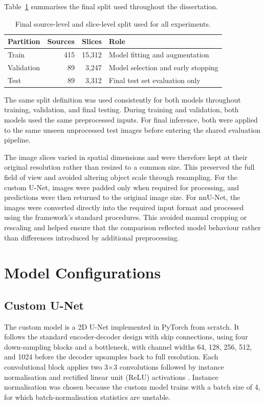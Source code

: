 \documentclass[logo,bsc,singlespacing,parskip,online]{infthesis}
\begin{document}
Table~\ref{tab:split-summary} summarises the final split used throughout the
dissertation. 

\begin{table}[H]
\centering
\small
\caption{Final source-level and slice-level split used for all experiments.}
\label{tab:split-summary}
\begin{tabular}{lrrl}
\toprule
\textbf{Partition} & \textbf{Sources} & \textbf{Slices} & \textbf{Role} \\
\midrule
Train      & 415 & 15{,}312 & Model fitting and augmentation \\
Validation & 89  & 3{,}247  & Model selection and early stopping \\
Test       & 89  & 3{,}312  & Final test set evaluation only \\
\bottomrule
\end{tabular}
\end{table}

The same split definition was used consistently for both models throughout
training, validation, and final testing. During training and validation, both
models used the same preprocessed inputs. For final inference, both were
applied to the same unseen unprocessed test images before entering the shared
evaluation pipeline.

The image slices varied in spatial dimensions and were therefore kept at their
original resolution rather than resized to a common size. This preserved the
full field of view and avoided altering object scale through resampling. For
the custom U-Net, images were padded only when required for processing, and
predictions were then returned to the original image size. For nnU-Net, the
images were converted directly into the required input format and processed
using the framework's standard procedures. This avoided manual cropping or
rescaling and helped ensure that the comparison reflected model behaviour
rather than differences introduced by additional preprocessing.

\section{Model Configurations}

\subsection{Custom U-Net}

The custom model is a 2D U-Net implemented in PyTorch from scratch. It follows
the standard encoder-decoder design with skip connections, using four
down-sampling blocks and a bottleneck, with channel widths 64, 128, 256, 512,
and 1024 before the decoder upsamples back to full resolution. Each
convolutional block applies two 3$\times$3 convolutions followed by instance
normalisation and rectified linear unit (ReLU) activations
\citep{nair2010relu}. Instance normalisation was chosen because the custom
model trains with a batch size of 4, for which batch-normalisation statistics
are unstable.
\end{document}
